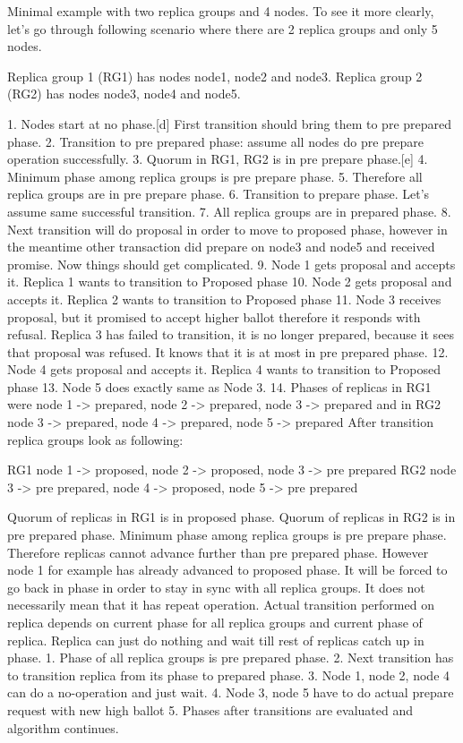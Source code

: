 Minimal example with two replica groups and 4 nodes.
To see it more clearly, let’s go through following scenario where there are 2 replica groups and only 5 nodes. 


Replica group 1 (RG1) has nodes node1, node2 and node3. 
Replica group 2 (RG2) has nodes node3, node4 and node5.


1. Nodes start at no phase.[d] First transition should bring them to pre prepared phase.
2. Transition to pre prepared phase: assume all nodes do pre prepare operation successfully.
3. Quorum in RG1, RG2 is in pre prepare phase.[e]
4. Minimum phase among replica groups is pre prepare phase.
5. Therefore all replica groups are in pre prepare phase.
6. Transition to prepare phase. Let’s assume same successful transition.
7. All replica groups are in prepared phase.
8. Next transition will do proposal in order to move to proposed phase, however in the meantime other transaction did prepare on node3 and node5 and received promise. Now things should get complicated. 
9. Node 1 gets proposal and accepts it. Replica 1 wants to transition to Proposed phase
10. Node 2 gets proposal and accepts it. Replica 2 wants to transition to Proposed phase
11. Node 3 receives proposal, but it promised to accept higher ballot therefore it responds with refusal. Replica 3 has failed to transition, it is no longer prepared, because it sees that proposal was refused. It knows that it is at most in pre prepared phase. 
12. Node 4 gets proposal and accepts it. Replica 4 wants to transition to Proposed phase
13. Node 5 does exactly same as Node 3.
14. Phases of replicas in RG1 were { node 1 -> prepared, node 2 -> prepared, node 3 -> prepared } and in RG2 { node 3 -> prepared, node 4 -> prepared, node 5 -> prepared }
        After transition replica groups look as following:


RG1 { node 1 -> proposed, node 2 -> proposed, node 3 -> pre prepared }
RG2 { node 3 -> pre prepared, node 4 -> proposed, node 5 -> pre prepared }


Quorum of replicas in RG1 is in proposed phase.
Quorum of replicas in RG2 is in pre prepared phase.
Minimum phase among replica groups is pre prepare phase.
        Therefore replicas cannot advance further than pre prepared phase. However node 1 for example has already advanced to proposed phase. It will be forced to go back in phase in order to stay in sync with all replica groups. It does not necessarily mean that it has repeat operation. Actual transition performed on replica depends on current phase for all replica groups and current phase of replica. Replica can just do nothing and wait till rest of replicas catch up in phase.
1. Phase of all replica groups is pre prepared phase.
2. Next transition has to transition replica from its phase to prepared phase.
3. Node 1, node 2, node 4 can do a no-operation and just wait.
4. Node 3, node 5 have to do actual prepare request with new high ballot
5. Phases after transitions are evaluated and algorithm continues.
        
